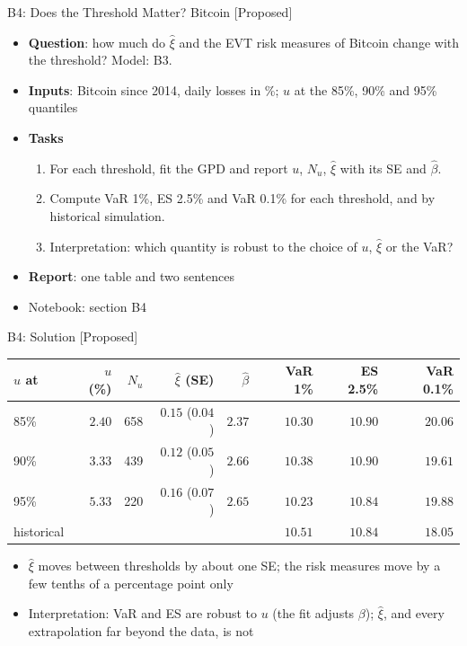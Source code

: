 \begin{frame}{B4: Does the Threshold Matter? Bitcoin [Proposed]}
\itemsize{\footnotesize}
\begin{itemize}
\item \textbf{Question}: how much do $\hat\xi$ and the EVT risk measures of Bitcoin change with the threshold? Model: B3.
\item \textbf{Inputs}: Bitcoin since 2014, daily losses in \%; $u$ at the 85\%, 90\% and 95\% quantiles
\item \textbf{Tasks}
\begin{enumerate}
    \item For each threshold, fit the GPD and report $u$, $N_u$, $\hat\xi$ with its SE and $\hat\beta$.
    \item Compute VaR 1\%, ES 2.5\% and VaR 0.1\% for each threshold, and by historical simulation.
    \item Interpretation: which quantity is robust to the choice of $u$, $\hat\xi$ or the VaR?
\end{enumerate}
\item \textbf{Report}: one table and two sentences
\item Notebook: section B4
\end{itemize}
\end{frame}

\ifsolutions
\begin{frame}{B4: Solution [Proposed]}
\itemsize{\footnotesize}
\begin{center}
\footnotesize
\begin{tabular}{lrrrrrrr}
\toprule
$u$ at & $u$ (\%) & $N_u$ & $\hat\xi$ (SE) & $\hat\beta$ & VaR 1\% & ES 2.5\% & VaR 0.1\% \\
\midrule
85\% & $2.40$ & 658 & $0.15$ ($0.04$) & $2.37$ & $10.30$ & $10.90$ & $20.06$ \\
90\% & $3.33$ & 439 & $0.12$ ($0.05$) & $2.66$ & $10.38$ & $10.90$ & $19.61$ \\
95\% & $5.33$ & 220 & $0.16$ ($0.07$) & $2.65$ & $10.23$ & $10.84$ & $19.88$ \\
historical & & & & & $10.51$ & $10.84$ & $18.05$ \\
\bottomrule
\end{tabular}
\end{center}
\begin{itemize}
    \item $\hat\xi$ moves between thresholds by about one SE; the risk measures move by a few tenths of a percentage point only
    \item Interpretation: VaR and ES are robust to $u$ (the fit adjusts $\beta$); $\hat\xi$, and every extrapolation far beyond the data, is not
\end{itemize}
\end{frame}
\fi

